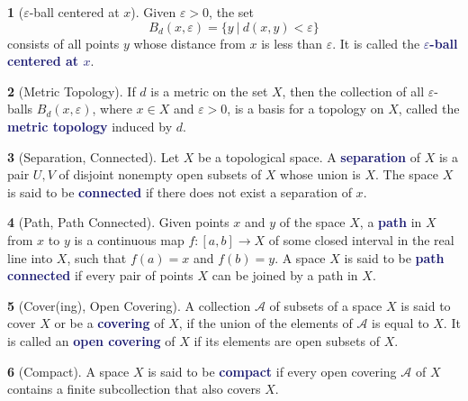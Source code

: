 \documentclass[12pt]{article}
\newcommand{\navy}[1]{\textcolor{MidnightBlue}{\bf #1}}
\theoremstyle{plain}
\theoremstyle{definition}
\newtheorem{definition}{\color{MidnightBlue}{\textbf{Definition}}}[section]
\newcommand{\1}{\mathbbm 1}
\newcommand{\e}{\varepsilon}
\newcommand{\aA}{\mathscr A}
\begin{document}
\begin{definition}[$\e$-ball centered at $x$]
Given $\e > 0$, the set
\begin{equation}
B_d(x,\e) = \{y \ | \ d(x,y) < \e \}
\end{equation}
consists of all points $y$ whose distance from $x$ is less than $\e$. It is called the \navy{$\e$-ball centered at $x$}.
\end{definition}

\begin{definition}[Metric Topology]
If $d$ is a metric on the set $X$, then the collection of all $\e$-balls $B_d(x,\e)$, where $x \in X$ and $\e > 0$, is a basis for a topology on $X$, called the \navy{metric topology} induced by $d$.
\end{definition}

\begin{definition}[Separation, Connected]
Let $X$ be a topological space. A \navy{separation} of $X$ is a pair $U,V$ of disjoint nonempty open subsets of $X$ whose union is $X$. The space $X$ is said to be \navy{connected} if there does not exist a separation of $x.$
\end{definition}

\begin{definition}[Path, Path Connected]
Given points $x$ and $y$ of the space $X$, a \navy{path} in $X$ from $x$ to $y$ is a continuous map $f:[a,b] \to X$ of some closed interval in the real line into $X$, such that $f(a) = x$ and $f(b) = y$. A space $X$ is said to be \navy{path connected} if every pair of points $X$ can be joined by a path in $X$.
\end{definition}

\begin{definition}[Cover(ing), Open Covering]
A collection $\aA$ of subsets of a space $X$ is said to cover $X$ or be a \navy{covering} of $X$, if the union of the elements of $\aA$ is equal to $X$. It is called an \navy{open covering} of $X$ if its elements are open subsets of $X$.
\end{definition}

\begin{definition}[Compact]
A space $X$ is said to be \navy{compact} if every open covering $\aA$ of $X$ contains a finite subcollection that also covers $X$.
\end{definition}
\end{document}
